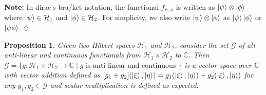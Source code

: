 \documentclass[12pt,twoside,fleqn]{report}
\theoremstyle{thmstyle}
\newtheorem{prop}{Proposition}[chapter]
\newenvironment{note}{\textbf{Note:}}{\hfill\ensuremath{\diamondsuit}}
\begin{document}
\begin{note}
    In dirac's bra/ket notation, the functional $f_{\psi,\phi}$ is written as $\ket{\psi} \otimes \ket{\phi}$ where $\ket{\psi} \in \mathcal{H}_1$ and $\ket{\phi} \in \mathcal{H}_2$.
    For simplicity, we also write $\ket{\psi} \otimes \ket{\phi}$ as $\ket{\psi}\ket{\phi}$ or $\ket{\psi\phi}$.
\end{note}



\begin{prop}
    Given two Hilbert spaces $\mathcal{H}_1$ and $\mathcal{H}_2$, consider the set $\mathcal{G}$ of all anti-linear and continuous functionals from $\mathcal{H}_1 \times \mathcal{H}_2$ to $\mathbb{C}$.
    Then $\mathcal{G} = \{ g: \mathcal{H}_1 \times \mathcal{H}_2 \to \mathbb{C} \; | \; g \text{ is anti-linear and continuous } \}$ is a vector space over $\mathbb{C}$ with vector addition defined as $[ g_1 + g_2] (\ket{\xi}, \ket{\eta}) = g_1(\ket{\xi}, \ket{\eta}) + g_2(\ket{\xi}, \ket{\eta})$ for any $g_1, g_2 \in \mathcal{G}$ and scalar multiplication is defined as expected.
\end{prop}
\end{document}
